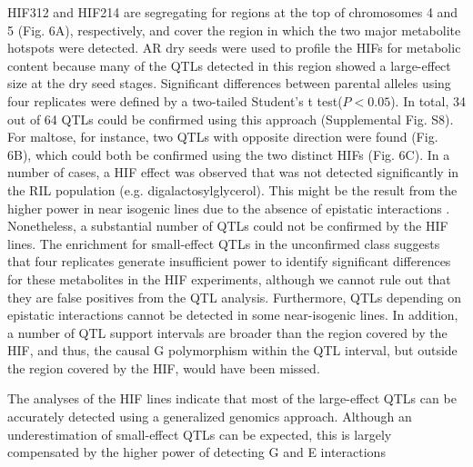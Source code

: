 HIF312 and HIF214 are segregating for regions at the top of chromosomes 4 and 5 (Fig. 6A), respectively,
and cover the region in which the two major metabolite hotspots were detected. AR dry seeds were used to
profile the HIFs for metabolic content because many of the QTLs detected in this region showed a 
large-effect size at the dry seed stages. Significant differences between parental alleles using four 
replicates were defined by a two-tailed Student's t test($P < 0.05$). In total, 34 out of 64 QTLs could 
be confirmed using this approach (Supplemental Fig. S8). For maltose, for instance, two QTLs with 
opposite direction were found (Fig. 6B), which could both be confirmed using the two distinct HIFs 
(Fig. 6C). In a number of cases, a HIF effect was observed that was not detected significantly
in the RIL population (e.g. digalactosylglycerol). This might be the result from the higher power in 
near isogenic lines due to the absence of epistatic interactions \cite{Keurentjes:2007a}. Nonetheless, 
a substantial number of QTLs could not be confirmed by the HIF lines. The enrichment for small-effect 
QTLs in the unconfirmed class suggests that four replicates generate insufficient power to identify 
significant differences for these metabolites in the HIF experiments, although we cannot rule out that 
they are false positives from the QTL analysis. Furthermore, QTLs depending on epistatic interactions 
cannot be detected in some near-isogenic lines. In addition, a number of QTL support intervals are 
broader than the region covered by the HIF, and thus, the causal G polymorphism within the QTL interval, 
but outside the region covered by the HIF, would have been missed.

The analyses of the HIF lines indicate that most of the large-effect QTLs can be accurately detected 
using a generalized genomics approach. Although an underestimation of small-effect QTLs can be expected, 
this is largely compensated by the higher power of detecting G and E interactions


